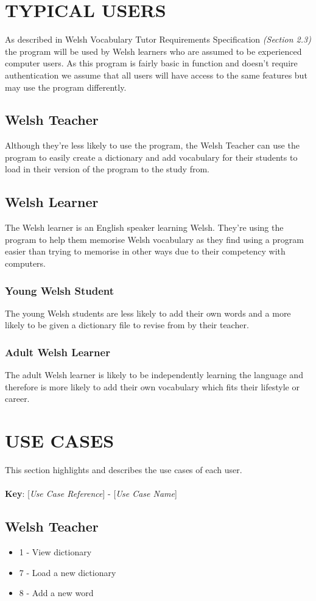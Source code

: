\documentclass{project}
\begin{document}
\section{TYPICAL USERS}
As described in Welsh Vocabulary Tutor Requirements Specification \emph{(Section 2.3)}\cite{se.qa.02} the program will be used by Welsh learners who are assumed to be experienced computer users. As this program is fairly basic in function and doesn't require authentication we assume that all users will have access to the same features but may use the program differently.
\subsection{Welsh Teacher}
Although they're less likely to use the program, the Welsh Teacher can use the program to easily create a dictionary and add vocabulary for their students to load in their version of the program to the study from.
\subsection{Welsh Learner}
The Welsh learner is an English speaker learning Welsh. They're using the program to help them memorise Welsh vocabulary as they find using a program easier than trying to memorise in other ways due to their competency with computers.
\subsubsection{Young Welsh Student}
The young Welsh students are less likely to add their own words and a more likely to be given a dictionary file to revise from by their teacher.
\subsubsection{Adult Welsh Learner}
The adult Welsh learner is likely to be independently learning the language and therefore is more likely to add their own vocabulary which fits their lifestyle or career.

\section{USE CASES}
This section highlights and describes the use cases of each user.
\\
\\
\textbf{Key}: [\textit{Use Case Reference}] - [\textit{Use Case Name}]
\subsection{Welsh Teacher}
\begin{itemize}
	\item 1 - View dictionary
	\item 7 - Load a new dictionary
	\item 8 - Add a new word
\end{itemize}
\end{document}

